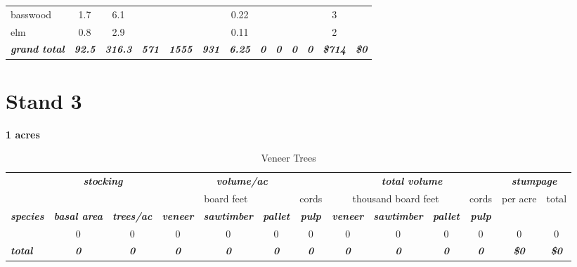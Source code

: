 \documentclass[landscape]{article}
\begin{document}
\begin{table}[H]
\begin{tabular}[t]{lcccccccccccc}
\rowcolor{gray!6}  basswood & 1.7 & 6.1 &  &  &  & 0.22 &  &  &  &  & 3 & \\
 
elm & 0.8 & 2.9 &  &  &  & 0.11 &  &  &  &  & 2 & \\
 
\rowcolor{gray!6}  \rowcolor[HTML]{DCDCDC}  \em{\textbf{grand total}} & \em{\textbf{92.5}} & \em{\textbf{316.3}} & \em{\textbf{571}} & \em{\textbf{1555}} & \em{\textbf{931}} & \em{\textbf{6.25}} & \em{\textbf{0}} & \em{\textbf{0}} & \em{\textbf{0}} & \em{\textbf{0}} & \em{\textbf{\$714}} & \em{\textbf{\$0}}\\
\bottomrule
\end{tabular}
\end{table}

\pagebreak

\section{Stand 3}\label{stand-3}

\textbf{1 acres}

\begin{table}[H]

\caption{\label{tab:unnamed-chunk-25}Veneer Trees}
\fontsize{10}{12}\selectfont
\begin{tabular}[t]{lcccccccccccc}
\toprule
\multicolumn{1}{c}{\em{\textbf{ }}} & \multicolumn{2}{c}{\em{\textbf{stocking}}} & \multicolumn{4}{c}{\em{\textbf{volume/ac }}} & \multicolumn{4}{c}{\em{\textbf{total volume}}} & \multicolumn{2}{c}{\em{\textbf{stumpage}}} \\
\cmidrule(l{3pt}r{3pt}){2-3} \cmidrule(l{3pt}r{3pt}){4-7} \cmidrule(l{3pt}r{3pt}){8-11} \cmidrule(l{3pt}r{3pt}){12-13}
\multicolumn{3}{c}{ } & \multicolumn{3}{c}{board feet} & \multicolumn{1}{c}{cords} & \multicolumn{3}{c}{thousand board feet} & \multicolumn{1}{c}{cords} & \multicolumn{1}{c}{per acre} & \multicolumn{1}{c}{total} \\
\cmidrule(l{3pt}r{3pt}){4-6} \cmidrule(l{3pt}r{3pt}){7-7} \cmidrule(l{3pt}r{3pt}){8-10} \cmidrule(l{3pt}r{3pt}){11-11} \cmidrule(l{3pt}r{3pt}){12-12} \cmidrule(l{3pt}r{3pt}){13-13}
\rowcolor[HTML]{DCDCDC}  \em{\textbf{species}} & \em{\textbf{basal area}} & \em{\textbf{trees/ac}} & \em{\textbf{veneer}} & \em{\textbf{sawtimber}} & \em{\textbf{pallet}} & \em{\textbf{pulp}} & \em{\textbf{veneer}} & \em{\textbf{sawtimber}} & \em{\textbf{pallet}} & \em{\textbf{pulp}} & \em{\textbf{ }} & \em{\textbf{ }}\\
\midrule
\rowcolor{gray!6}   & 0 & 0 & 0 & 0 & 0 & 0 & 0 & 0 & 0 & 0 & 0 & 0\\
 
\rowcolor[HTML]{DCDCDC}  \em{\textbf{total}} & \em{\textbf{0}} & \em{\textbf{0}} & \em{\textbf{0}} & \em{\textbf{0}} & \em{\textbf{0}} & \em{\textbf{0}} & \em{\textbf{0}} & \em{\textbf{0}} & \em{\textbf{0}} & \em{\textbf{0}} & \em{\textbf{\$0}} & \em{\textbf{\$0}}\\
\bottomrule
\end{tabular}
\end{table}
\end{document}

